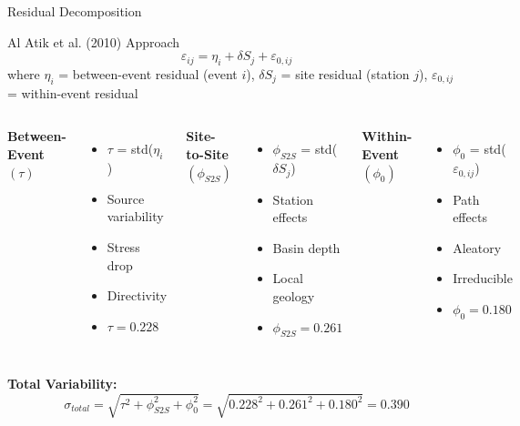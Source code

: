 \documentclass[aspectratio=169,11pt]{beamer}
\begin{document}
\begin{frame}{Residual Decomposition}
\begin{block}{Al Atik et al. (2010) Approach}
$$\varepsilon_{ij} = \eta_i + \delta S_j + \varepsilon_{0,ij}$$
\scriptsize
where $\eta_i$ = between-event residual (event $i$), $\delta S_j$ = site residual (station $j$), $\varepsilon_{0,ij}$ = within-event residual
\end{block}

\begin{columns}[T]
\textbf{Between-Event} $(\tau)$
\begin{itemize}
    \item $\tau$ = std($\eta_i$)
    \item Source variability
    \item Stress drop
    \item Directivity
    \item $\tau = 0.228$
\end{itemize}

\textbf{Site-to-Site} $(\phi_{S2S})$
\begin{itemize}
    \item $\phi_{S2S}$ = std($\delta S_j$)
    \item Station effects
    \item Basin depth
    \item Local geology
    \item $\phi_{S2S} = 0.261$
\end{itemize}

\textbf{Within-Event} $(\phi_0)$
\begin{itemize}
    \item $\phi_0$ = std($\varepsilon_{0,ij}$)
    \item Path effects
    \item Aleatory
    \item Irreducible
    \item $\phi_0 = 0.180$
\end{itemize}
\end{columns}

\vspace{0.2cm}
\textbf{Total Variability:}
$$\sigma_{total} = \sqrt{\tau^2 + \phi_{S2S}^2 + \phi_0^2} = \sqrt{0.228^2 + 0.261^2 + 0.180^2} = 0.390$$
\end{frame}
\end{document}
